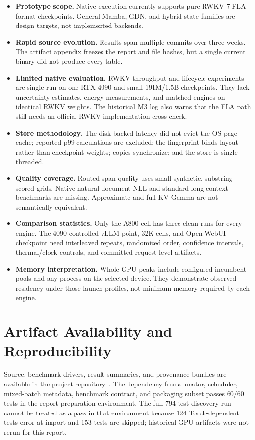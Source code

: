 \documentclass[10pt,letterpaper]{article}
\begin{document}
\begin{itemize}
  \item \textbf{Prototype scope.}  Native execution currently supports pure
  RWKV-7 FLA-format checkpoints.  General Mamba, GDN, and hybrid state families
  are design targets, not implemented backends.
  \item \textbf{Rapid source evolution.}  Results span multiple commits over
  three weeks.  The artifact appendix freezes the report and file hashes, but a
  single current binary did not produce every table.
  \item \textbf{Limited native evaluation.}  RWKV throughput and lifecycle
  experiments are single-run on one RTX 4090 and small 191M/1.5B checkpoints.
  They lack uncertainty estimates, energy measurements, and matched engines on
  identical RWKV weights.  The historical M3 log also warns that the FLA path
  still needs an official-RWKV implementation cross-check.
  \item \textbf{Store methodology.}  The disk-backed latency did not evict the
  OS page cache; reported p99 calculations are excluded; the fingerprint binds
  layout rather than checkpoint weights; copies synchronize; and the store is
  single-threaded.
  \item \textbf{Quality coverage.}  Routed-span quality uses small synthetic,
  substring-scored grids.  Native natural-document NLL and standard long-context
  benchmarks are missing.  Approximate and full-KV Gemma are not semantically
  equivalent.
  \item \textbf{Comparison statistics.}  Only the A800 cell has three clean
  runs for every engine.  The 4090 controlled vLLM point, 32K cells, and Open
  WebUI checkpoint need interleaved repeats, randomized order, confidence
  intervals, thermal/clock controls, and committed request-level artifacts.
  \item \textbf{Memory interpretation.}  Whole-GPU peaks include configured
  incumbent pools and any process on the selected device.  They demonstrate
  observed residency under those launch profiles, not minimum memory required
  by each engine.
\end{itemize}

\section{Artifact Availability and Reproducibility}

Source, benchmark drivers, result summaries, and provenance bundles are
available in the project repository~\cite{wkvmrepo}.  The dependency-free
allocator, scheduler, mixed-batch metadata, benchmark contract, and packaging
subset passes 60/60 tests in the report-preparation environment.  The full
794-test discovery run cannot be treated as a pass in that environment because
124 Torch-dependent tests error at import and 153 tests are skipped; historical
GPU artifacts were not rerun for this report.
\end{document}
